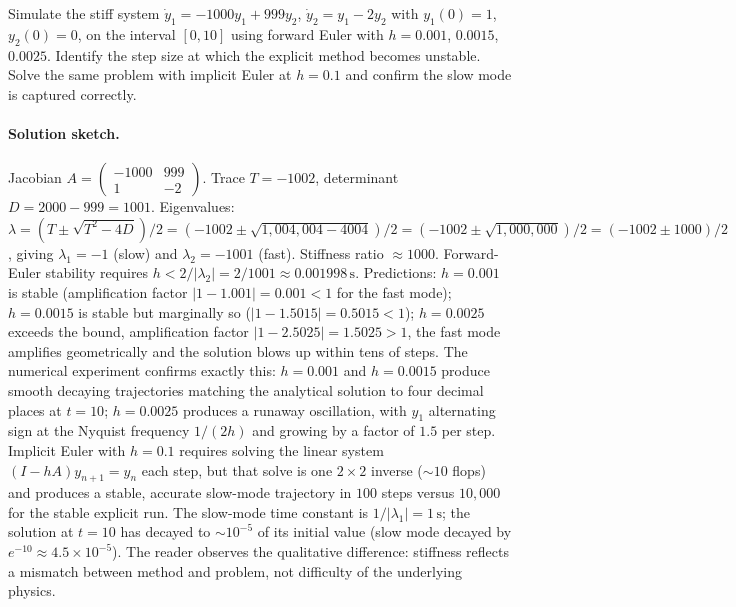 \begin{exercise}
Simulate the stiff system $\dot{y}_{1} = -1000 y_{1} + 999 y_{2}$,
$\dot{y}_{2} = y_{1} - 2 y_{2}$ with $y_{1}(0) = 1$, $y_{2}(0) =
0$, on the interval $[0, 10]$ using forward Euler with $h =
0.001$, $0.0015$, $0.0025$. Identify the step size at which the
explicit method becomes unstable. Solve the same problem with
implicit Euler at $h = 0.1$ and confirm the slow mode is
captured correctly.

\paragraph{Solution sketch.} Jacobian
$A = \begin{pmatrix} -1000 & 999 \\ 1 & -2 \end{pmatrix}$.
Trace $T = -1002$, determinant $D = 2000 - 999 = 1001$.
Eigenvalues: $\lambda = (T \pm \sqrt{T^{2} - 4 D})/2 = (-1002
\pm \sqrt{1{,}004{,}004 - 4004})/2 = (-1002 \pm \sqrt{1{,}000{,}000})/2
= (-1002 \pm 1000)/2$, giving $\lambda_{1} = -1$ (slow) and
$\lambda_{2} = -1001$ (fast). Stiffness ratio $\approx 1000$.
Forward-Euler stability requires $h < 2/|\lambda_{2}| = 2/1001
\approx 0.001998\,\si{\second}$. Predictions: $h = 0.001$ is
stable (amplification factor $|1 - 1.001| = 0.001 < 1$ for the
fast mode); $h = 0.0015$ is stable but marginally so ($|1 -
1.5015| = 0.5015 < 1$); $h = 0.0025$ exceeds the bound,
amplification factor $|1 - 2.5025| = 1.5025 > 1$, the fast mode
amplifies geometrically and the solution blows up within tens of
steps. The numerical experiment confirms exactly this: $h =
0.001$ and $h = 0.0015$ produce smooth decaying trajectories
matching the analytical solution to four decimal places at
$t = 10$; $h = 0.0025$ produces a runaway oscillation, with
$y_{1}$ alternating sign at the Nyquist frequency $1/(2 h)$ and
growing by a factor of $1.5$ per step. Implicit Euler with
$h = 0.1$ requires solving the linear system $(I - h A) y_{n+1}
= y_{n}$ each step, but that solve is one $2 \times 2$ inverse
($\sim 10$ flops) and produces a stable, accurate slow-mode
trajectory in $100$ steps versus $10{,}000$ for the stable
explicit run. The slow-mode time constant is $1/|\lambda_{1}|
= 1\,\si{\second}$; the solution at $t = 10$ has decayed to
$\sim 10^{-5}$ of its initial value (slow mode decayed by
$e^{-10} \approx 4.5 \times 10^{-5}$). The reader observes the
qualitative difference: stiffness reflects a mismatch between
method and problem, not difficulty of the underlying physics.
\end{exercise}

